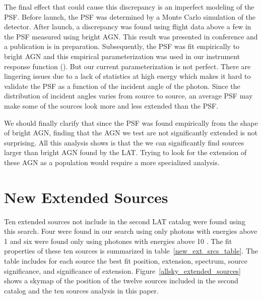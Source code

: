 \documentclass[12pt,preprint]{aastex}
\newcommand{\gev}{\text{GeV}\xspace}
\begin{document}
The final effect that could cause this discrepancy is an imperfect
modeling of the PSF.  Before launch, the PSF
was determined by a Monte Carlo simulation of the detector.
After launch, a discrepancy was found using flight data above a
few \gev in the PSF measured using bright AGN.  This result
was presented in conference and a publication is in preparation.
Subsequently, the PSF was fit empirically to bright AGN and this
empirical parameterization was used in our instrument
response function (\cite{lat_on_orbit_psf}).
But our current parameterization is not perfect. There are lingering
issues due to a lack of statistics at high energy which makes it hard to
validate the PSF as a function of the incident angle of the photon. Since
the distribution of incident angles varies from source to source, an
average PSF may make some of the sources look more and less extended
than the PSF.

We should finally clarify that since the PSF was found empirically
from the shape of bright AGN, finding that the AGN we test are not
significantly extended is not surprising.  All this analysis shows
is that the we can significantly find sources larger than bright AGN
found by the LAT.  Trying to look for the extension of these AGN as a
population would require a more specialized analysis.

\section{New Extended Sources}
\label{new_ext_srcs_section}


Ten extended sources not include in the second LAT catalog were found
using this search.  Four were found in our search using only photons
with energies above 1 \gev and six were found only using photones with
energies above 10 \gev.  The fit properties of these ten sources is
summarized in table~\ref{new_ext_srcs_table}.  The table includes for each
source the best fit position, extension, spectrum, source significance,
and significance of extension.  Figure~\ref{allsky_extended_sources}
shows a skymap of the position of the twelve sources included in the
second catalog and the ten sources analysis in this paper.
\end{document}

